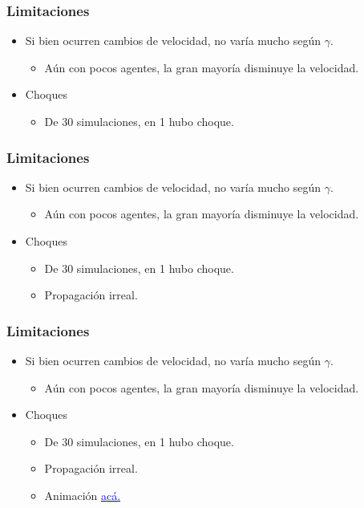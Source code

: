 \documentclass[10pt, compress]{beamer}
\begin{document}
\begin{frame}[fragile]
\frametitle{Limitaciones}

\begin{itemize}
\item Si bien ocurren cambios de velocidad, no var\'ia mucho seg\'un $\gamma$. 
	\begin{itemize}
	\item A\'un con pocos agentes, la gran mayor\'ia disminuye la velocidad.
	\end{itemize}
\item Choques
	\begin{itemize}
	\item De 30 simulaciones, en 1 hubo choque.
	\end{itemize}
\end{itemize}

\end{frame}

\begin{frame}[fragile]
\frametitle{Limitaciones}

\begin{itemize}
\item Si bien ocurren cambios de velocidad, no var\'ia mucho seg\'un $\gamma$. 
	\begin{itemize}
	\item A\'un con pocos agentes, la gran mayor\'ia disminuye la velocidad.
	\end{itemize}
\item Choques
	\begin{itemize}
	\item De 30 simulaciones, en 1 hubo choque.
	\item Propagaci\'on irreal.
	\end{itemize}
\end{itemize}

\end{frame}

\begin{frame}[fragile]
\frametitle{Limitaciones}

\begin{itemize}
\item Si bien ocurren cambios de velocidad, no var\'ia mucho seg\'un $\gamma$. 
	\begin{itemize}
	\item A\'un con pocos agentes, la gran mayor\'ia disminuye la velocidad.
	\end{itemize}
\item Choques
	\begin{itemize}
	\item De 30 simulaciones, en 1 hubo choque.
	\item Propagaci\'on irreal.
	\item Animaci\'on \href{https://www.youtube.com/watch?v=Yan5BorT-o0}{\textcolor{blue}{ac\'a.}}
	\end{itemize}
\end{itemize}

\end{frame}
\end{document}
